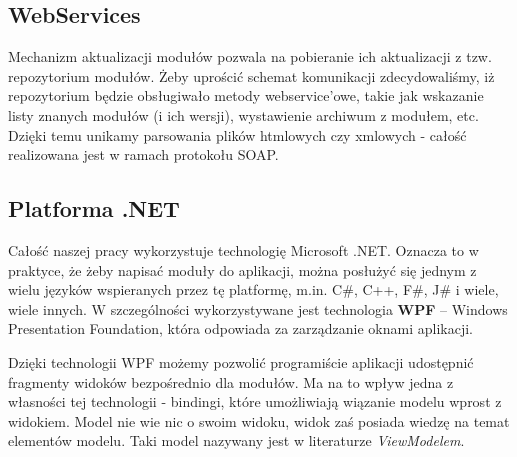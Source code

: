\subsection{WebServices}
Mechanizm aktualizacji modułów pozwala na pobieranie ich aktualizacji z tzw. repozytorium modułów. Żeby uprościć schemat komunikacji zdecydowaliśmy, iż repozytorium będzie obsługiwało metody webservice'owe, takie jak wskazanie listy znanych modułów (i ich wersji), wystawienie archiwum z modułem, etc. Dzięki temu unikamy parsowania plików htmlowych czy xmlowych - całość realizowana jest w ramach protokołu SOAP.

\subsection{Platforma .NET}
Całość naszej pracy wykorzystuje technologię Microsoft .NET. Oznacza to w praktyce, że żeby napisać moduły do aplikacji, można posłużyć się jednym z wielu języków wspieranych przez tę platformę, m.in. C\#, C++, F\#, J\# i wiele, wiele innych. W szczególności wykorzystywane jest technologia \textbf{WPF} -- Windows Presentation Foundation, która odpowiada za zarządzanie oknami aplikacji.

Dzięki technologii WPF możemy pozwolić programiście aplikacji udostępnić fragmenty widoków bezpośrednio dla modułów. Ma na to wpływ jedna z własności tej technologii - bindingi, które umożliwiają wiązanie modelu wprost z widokiem. Model nie wie nic o swoim widoku, widok zaś posiada wiedzę na temat elementów modelu. Taki model nazywany jest w literaturze \textit{ViewModelem}.

